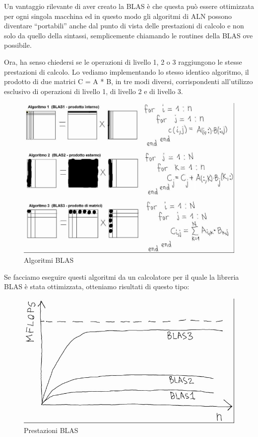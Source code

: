 Un vantaggio rilevante di aver creato la BLAS è che questa può essere ottimizzata per ogni singola macchina ed in questo modo gli algoritmi di ALN possono diventare ``portabili'' anche dal punto di vista delle prestazioni di calcolo e non solo da quello della sintassi, semplicemente chiamando le routines della BLAS ove possibile.

Ora, ha senso chiedersi se le operazioni di livello 1, 2 o 3 raggiungono le stesse prestazioni di calcolo. Lo vediamo implementando lo stesso identico algoritmo, il prodotto di due matrici C = A * B, in tre modi diversi, corrispondenti all'utilizzo esclusivo di operazioni di livello 1, di livello 2 e di livello 3.

\begin{figure}[ht!]
\centering
\includegraphics[width=130mm]{images/implementazioni_prodotto_di_matrici.jpg}
\caption{Algoritmi BLAS}
\label{overflow}
\end{figure}

Se facciamo eseguire questi algoritmi da un calcolatore per il quale la libreria BLAS è stata ottimizzata, otteniamo risultati di questo tipo:

\begin{figure}[ht!]
\centering
\includegraphics[width=130mm]{images/prestazioni_BLAS.JPG}
\caption{Prestazioni BLAS}
\label{overflow}
\end{figure}

